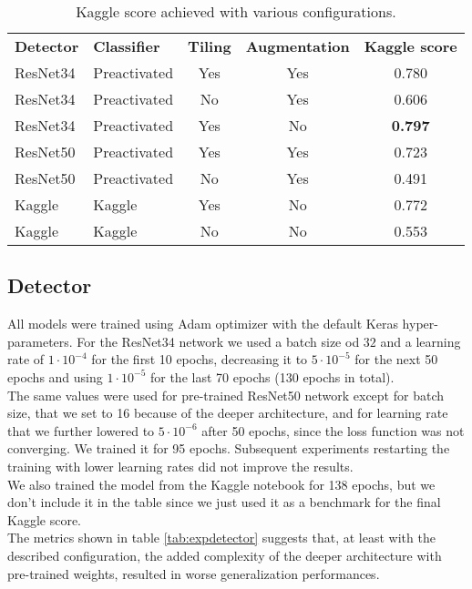 \begin{table*}[h]
	\centering
	\begin{tabular}{llccc}
		\rowcolor[HTML]{EFEFEF} 
		\textbf{Detector} & \textbf{Classifier} & \textbf{Tiling} & \textbf{Augmentation} & \textbf{Kaggle score} \\
		ResNet34          & Preactivated        & Yes             & Yes                   & 0.780                 \\
		ResNet34          & Preactivated        & No              & Yes                   & 0.606                 \\
		ResNet34          & Preactivated        & Yes             & No                    & \textbf{0.797}                      \\
		ResNet50          & Preactivated        & Yes             & Yes                   & 0.723                      \\
		ResNet50          & Preactivated        & No              & Yes                   & 0.491                 \\
		Kaggle            & Kaggle              & Yes             & No                   &  0.772                     \\
		Kaggle            & Kaggle              & No              & No                   & 0.553                     
	\end{tabular}
	\caption{Kaggle score achieved with various configurations.}
	\label{tab:finaltests}
\end{table*}

\subsection{Detector}
\label{ssec:detectorexp}

All models were trained using Adam optimizer with the default Keras hyper-parameters. For the ResNet34 network we used a batch size od $32$ and a learning rate of $1 \cdot 10^{-4}$ for the first 10 epochs, decreasing it to $5 \cdot 10^{-5}$ for the next 50 epochs and using $1 \cdot 10^{-5}$ for the last 70 epochs (130 epochs in total). \\
The same values were used for pre-trained ResNet50 network except for batch size, that we set to 16 because of the deeper architecture, and for learning rate that we further lowered to $5 \cdot 10^{-6}$ after 50 epochs, since the loss function was not converging. We trained it for 95 epochs. Subsequent experiments restarting the training with lower learning rates did not improve the results.\\
We also trained the model from the Kaggle notebook for 138 epochs, but we don't include it in the table since we just used it as a benchmark for the final Kaggle score.\\
The metrics shown in table \ref{tab:expdetector} suggests that, at least with the described configuration, the added complexity of the deeper architecture with pre-trained weights, resulted in worse generalization performances.

